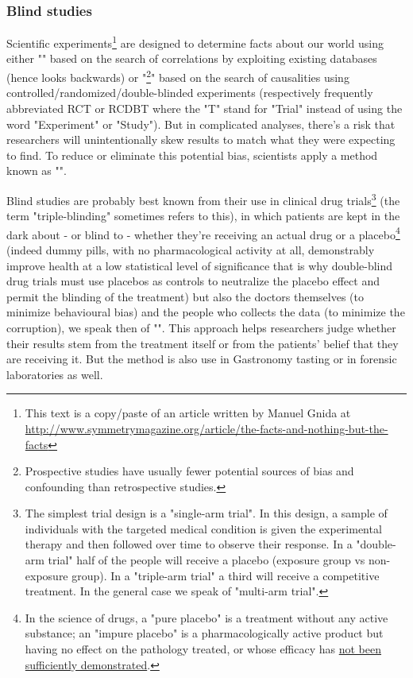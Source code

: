 	\subsubsection{Blind studies}
	Scientific experiments\footnote{This text is a copy/paste of an article written by Manuel Gnida at \url{http://www.symmetrymagazine.org/article/the-facts-and-nothing-but-the-facts}} are designed to determine facts about our world using either "" based on the search of correlations by exploiting existing databases (hence looks backwards) or "\footnote{Prospective studies have usually fewer potential sources of bias and confounding than retrospective studies.}" based on the search of causalities using controlled/randomized/double-blinded experiments (respectively frequently abbreviated RCT or RCDBT where the "T" stand for "Trial" instead of using the word "Experiment" or "Study"). But in complicated analyses, there's a risk that researchers will unintentionally skew results to match what they were expecting to find. To reduce or eliminate this potential bias, scientists apply a method known as "".
	
	Blind studies are probably best known from their use in clinical drug trials\footnote{The simplest trial design is a "single-arm trial". In this design, a sample of individuals with the targeted medical condition is given the experimental therapy and then followed over time to observe their response. In a "double-arm trial" half of the people will receive a placebo (exposure group vs non-exposure group). In a "triple-arm trial" a third will receive a competitive treatment. In the general case we speak of "multi-arm trial".} (the term "triple-blinding" sometimes refers to this), in which patients are kept in the dark about - or blind to - whether they're receiving an actual drug or a placebo\footnote{In the science of drugs, a "pure placebo" is a treatment without any active substance; an "impure placebo" is a pharmacologically active product but having no effect on the pathology treated, or whose efficacy has \underline{not been sufficiently demonstrated}.} (indeed dummy pills, with no pharmacological activity at all, demonstrably improve health at a low statistical level of significance that is why double-blind drug trials must use placebos as controls to neutralize the placebo effect and permit the blinding of the treatment) but also the doctors themselves (to minimize behavioural bias) and the people who collects the data (to minimize the corruption), we speak then of "". This approach helps researchers judge whether their results stem from the treatment itself or from the patients' belief that they are receiving it. But the method is also use in Gastronomy tasting or in forensic laboratories as well.
	
